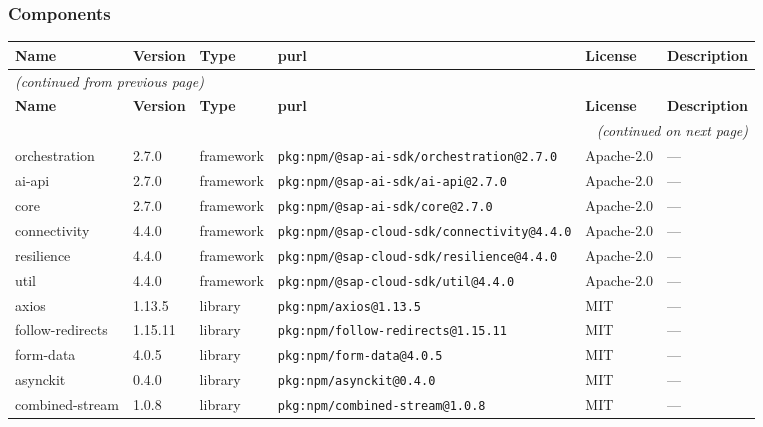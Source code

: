 \documentclass[11pt,a4paper]{article}
\begin{document}
\subsubsection*{Components}
\begin{longtable}{|p{4cm}|p{2cm}|p{1.6cm}|p{5cm}|p{1.5cm}|p{3.5cm}|}
\toprule
\rowcolor{sbomhdr}\textbf{Name} & \textbf{Version} & \textbf{Type} & \textbf{purl} & \textbf{License} & \textbf{Description} \\
\midrule
\endfirsthead
\multicolumn{6}{l}{\small\itshape (continued from previous page)} \\
\toprule
\rowcolor{sbomhdr}\textbf{Name} & \textbf{Version} & \textbf{Type} & \textbf{purl} & \textbf{License} & \textbf{Description} \\
\midrule
\endhead
\midrule
\multicolumn{6}{r}{\small\itshape (continued on next page)} \\
\endfoot
\bottomrule
\endlastfoot
\raggedright orchestration & 2.7.0 & framework & \small\texttt{pkg:npm/@sap-ai-sdk/orchestration@2.7.0} & Apache-2.0 & \small — \\
\raggedright ai-api & 2.7.0 & framework & \small\texttt{pkg:npm/@sap-ai-sdk/ai-api@2.7.0} & Apache-2.0 & \small — \\
\raggedright core & 2.7.0 & framework & \small\texttt{pkg:npm/@sap-ai-sdk/core@2.7.0} & Apache-2.0 & \small — \\
\raggedright connectivity & 4.4.0 & framework & \small\texttt{pkg:npm/@sap-cloud-sdk/connectivity@4.4.0} & Apache-2.0 & \small — \\
\raggedright resilience & 4.4.0 & framework & \small\texttt{pkg:npm/@sap-cloud-sdk/resilience@4.4.0} & Apache-2.0 & \small — \\
\raggedright util & 4.4.0 & framework & \small\texttt{pkg:npm/@sap-cloud-sdk/util@4.4.0} & Apache-2.0 & \small — \\
\raggedright axios & 1.13.5 & library & \small\texttt{pkg:npm/axios@1.13.5} & MIT & \small — \\
\raggedright follow-redirects & 1.15.11 & library & \small\texttt{pkg:npm/follow-redirects@1.15.11} & MIT & \small — \\
\raggedright form-data & 4.0.5 & library & \small\texttt{pkg:npm/form-data@4.0.5} & MIT & \small — \\
\raggedright asynckit & 0.4.0 & library & \small\texttt{pkg:npm/asynckit@0.4.0} & MIT & \small — \\
\raggedright combined-stream & 1.0.8 & library & \small\texttt{pkg:npm/combined-stream@1.0.8} & MIT & \small — \\

\end{longtable}
\end{document}
